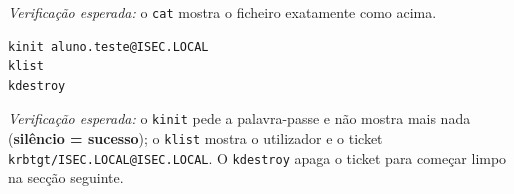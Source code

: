 \emph{Verificação esperada:} o \texttt{cat} mostra o ficheiro exatamente como acima.


\begin{lstlisting}[style=bashstyle]
kinit aluno.teste@ISEC.LOCAL
klist
kdestroy
\end{lstlisting}

\emph{Verificação esperada:} o \texttt{kinit} pede a palavra-passe e não mostra mais nada (\textbf{silêncio = sucesso}); o \texttt{klist} mostra o utilizador e o ticket \texttt{krbtgt/\allowbreak{}ISEC.LOCAL@ISEC.LOCAL}. O \texttt{kdestroy} apaga o ticket para começar limpo na secção seguinte.

